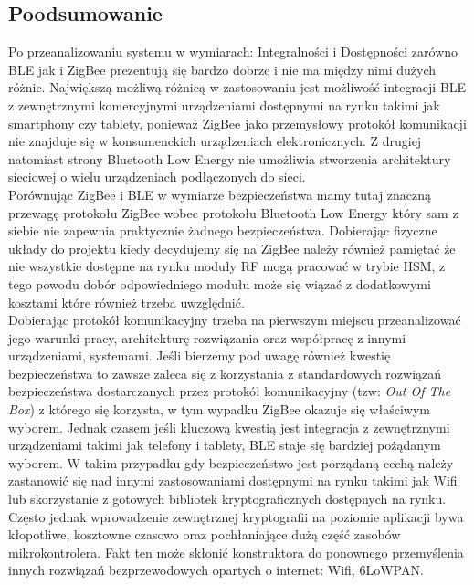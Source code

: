 \subsection{Poodsumowanie}
\par
\tab Po przeanalizowaniu systemu w wymiarach: Integralności i Dostępności zarówno BLE jak i ZigBee prezentują się bardzo dobrze i nie ma między nimi dużych różnic. Największą możliwą różnicą w zastosowaniu jest możliwość integracji BLE z zewnętrznymi komercyjnymi urządzeniami dostępnymi na rynku takimi jak smartphony czy tablety, ponieważ ZigBee jako przemysłowy protokół komunikacji nie znajduje się w konsumenckich urządzeniach elektronicznych. Z drugiej natomiast strony Bluetooth Low Energy nie umożliwia stworzenia architektury sieciowej o wielu urządzeniach podłączonych do sieci. \\
Porównując ZigBee i BLE w wymiarze bezpieczeństwa mamy tutaj znaczną przewagę protokołu ZigBee wobec protokołu Bluetooth Low Energy który sam z siebie nie zapewnia praktycznie żadnego bezpieczeństwa. Dobierając fizyczne układy do projektu kiedy decydujemy się na ZigBee należy również pamiętać że nie wszystkie dostępne na rynku moduły RF mogą pracować w trybie HSM, z tego powodu dobór odpowiedniego modułu może się wiązać z dodatkowymi kosztami które również trzeba uwzględnić.\\

Dobierając protokół komunikacyjny trzeba na pierwszym miejscu przeanalizować jego warunki pracy, architekturę rozwiązania oraz współpracę z innymi urządzeniami, systemami. Jeśli bierzemy pod uwagę również kwestię bezpieczeństwa to zawsze zaleca się z korzystania z standardowych rozwiązań bezpieczeństwa dostarczanych przez protokół komunikacyjny (tzw: \textit{Out Of The Box}) z którego się korzysta, w tym wypadku ZigBee okazuje się właściwym wyborem. Jednak czasem jeśli kluczową kwestią jest integracja z zewnętrznymi urządzeniami takimi jak telefony i tablety, BLE staje się bardziej pożądanym wyborem. W takim przypadku gdy bezpieczeństwo jest porządaną cechą należy zastanowić się nad innymi zastosowaniami dostępnymi na rynku takimi jak Wifi lub skorzystanie z gotowych bibliotek kryptograficznych dostępnych na rynku. Często jednak wprowadzenie zewnętrznej kryptografii na poziomie aplikacji bywa kłopotliwe, kosztowne czasowo oraz pochłaniające dużą część zasobów mikrokontrolera. Fakt ten może skłonić konstruktora do ponownego przemyślenia innych rozwiązań bezprzewodowych opartych o internet: Wifi, 6LoWPAN. 

\clearpage
